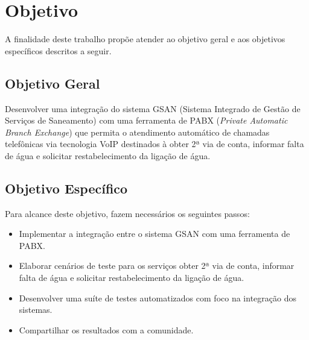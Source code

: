 \section*{Objetivo}

A finalidade deste trabalho propõe atender ao objetivo geral e aos objetivos específicos descritos a seguir.

\subsection*{Objetivo Geral}

Desenvolver uma integração do sistema GSAN (Sistema Integrado de Gestão de Serviços de Saneamento) com uma ferramenta de PABX (\textit{Private Automatic Branch Exchange}) que permita o atendimento automático de chamadas telefônicas via tecnologia VoIP destinados à obter 2ª via de conta, informar falta de água e solicitar restabelecimento da ligação de água.

\subsection*{Objetivo Específico}
Para alcance deste objetivo, fazem necessários os seguintes passos:
\begin{itemize}
	\item Implementar a integração entre o sistema GSAN com uma ferramenta de PABX.
	\item Elaborar cenários de teste para os serviços obter 2ª via de conta, informar falta de água e solicitar restabelecimento da ligação de água.
	\item Desenvolver uma suíte de testes automatizados com foco na integração dos sistemas. 
	\item Compartilhar os resultados com a comunidade.
\end{itemize}